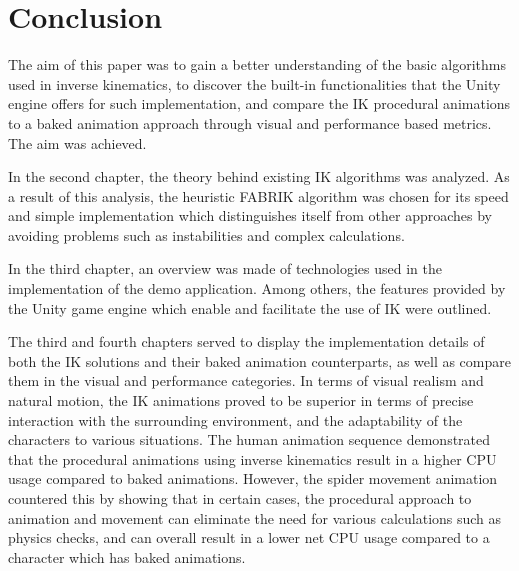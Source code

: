 \chapter{Conclusion} 
The aim of this paper was to gain a better understanding of the basic algorithms
used in inverse kinematics, to discover the built-in functionalities that the Unity
engine offers for such implementation, and compare the IK procedural animations
to a baked animation approach through visual and performance based
metrics. The aim was achieved. 

In the second chapter, the theory behind existing IK
algorithms was analyzed. As a result of this analysis, the heuristic FABRIK
algorithm was chosen for its speed and simple implementation which distinguishes
itself from other approaches by avoiding problems such as instabilities and
complex calculations.

In the third chapter, an overview was made of technologies used in the
implementation of the demo application. Among others, the features provided by
the Unity game engine which enable and facilitate the use of IK were outlined.

The third and fourth chapters served to display the implementation details of
both the IK solutions and their baked animation counterparts, as well as compare
them in the visual and performance categories. In terms of visual realism and
natural motion, the IK animations proved to be superior in terms of precise
interaction with the surrounding environment, and the adaptability of the
characters to various situations. The human animation sequence demonstrated that
the procedural animations using inverse kinematics result in a higher CPU usage
compared to baked animations. However, the spider movement animation countered
this by showing that in certain cases, the procedural approach to animation and
movement can eliminate the need for various calculations such as physics checks,
and can overall result in a lower net CPU usage compared to a character which
has baked animations.
